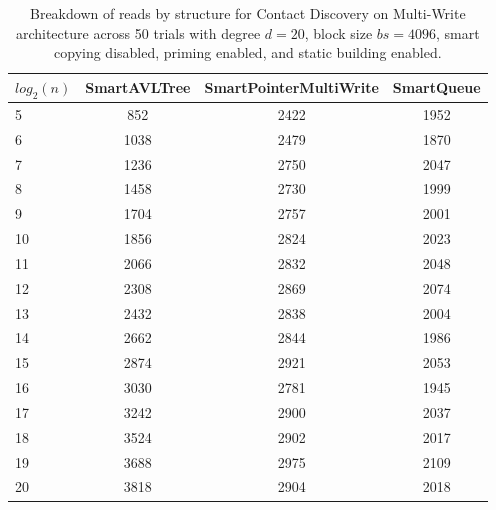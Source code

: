 \begin{table}[]
\centering
\begin{tabular}{|l|c|c|c|}
$log_2(n)$ & SmartAVLTree & SmartPointerMultiWrite & SmartQueue \\ \hline
5 & 852 & 2422 & 1952 \\ \hline
6 & 1038 & 2479 & 1870 \\ \hline
7 & 1236 & 2750 & 2047 \\ \hline
8 & 1458 & 2730 & 1999 \\ \hline
9 & 1704 & 2757 & 2001 \\ \hline
10 & 1856 & 2824 & 2023 \\ \hline
11 & 2066 & 2832 & 2048 \\ \hline
12 & 2308 & 2869 & 2074 \\ \hline
13 & 2432 & 2838 & 2004 \\ \hline
14 & 2662 & 2844 & 1986 \\ \hline
15 & 2874 & 2921 & 2053 \\ \hline
16 & 3030 & 2781 & 1945 \\ \hline
17 & 3242 & 2900 & 2037 \\ \hline
18 & 3524 & 2902 & 2017 \\ \hline
19 & 3688 & 2975 & 2109 \\ \hline
20 & 3818 & 2904 & 2018 \\ \hline
\end{tabular}
\caption{Breakdown of reads by structure for Contact Discovery on Multi-Write architecture across 50 trials with degree $d=20$, block size $bs=4096$, smart copying disabled, priming enabled, and static building enabled.}
    \label{tab:reads_by_structure_cd_d20_bs4096_trials50_copiesfalse_primetrue_staticinsertiontrue_ptmultiwrite_movetrue}
\end{table}

